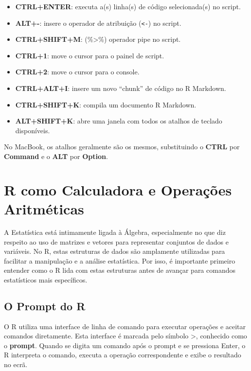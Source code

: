 \documentclass[
]{book}
\begin{document}
\begin{itemize}
\item
  \textbf{CTRL+ENTER}: executa a(s) linha(s) de código selecionada(s) no
  script.
\item
  \textbf{ALT+-}: insere o operador de atribuição (\texttt{\textless{}-}) no script.
\item
  \textbf{CTRL+SHIFT+M}: (\%\textgreater\%) operador pipe no script.
\item
  \textbf{CTRL+1}: move o cursor para o painel de script.
\item
  \textbf{CTRL+2}: move o cursor para o console.
\item
  \textbf{CTRL+ALT+I}: insere um novo ``chunk'' de código no R Markdown.
\item
  \textbf{CTRL+SHIFT+K}: compila um documento R Markdown.
\item
  \textbf{ALT+SHIFT+K}: abre uma janela com todos os atalhos de teclado
  disponíveis.
\end{itemize}

No MacBook, os atalhos geralmente são os mesmos, substituindo o \textbf{CTRL}
por \textbf{Command} e o \textbf{ALT} por \textbf{Option}.

\chapter{R como Calculadora e Operações Aritméticas}\label{r-como-calculadora-e-operauxe7uxf5es-aritmuxe9ticas}

A Estatística está intimamente ligada à Álgebra, especialmente no que
diz respeito ao uso de matrizes e vetores para representar conjuntos de
dados e variáveis. No R, estas estruturas de dados são amplamente
utilizadas para facilitar a manipulação e a análise estatística. Por
isso, é importante primeiro entender como o R lida com estas estruturas
antes de avançar para comandos estatísticos mais específicos.

\section{O Prompt do R}\label{o-prompt-do-r}

O R utiliza uma interface de linha de comando para executar operações e
aceitar comandos diretamente. Esta interface é marcada pelo símbolo \textgreater,
conhecido como o \textbf{prompt}. Quando se digita um comando após o prompt e
se pressiona Enter, o R interpreta o comando, executa a operação
correspondente e exibe o resultado no ecrã.
\end{document}
